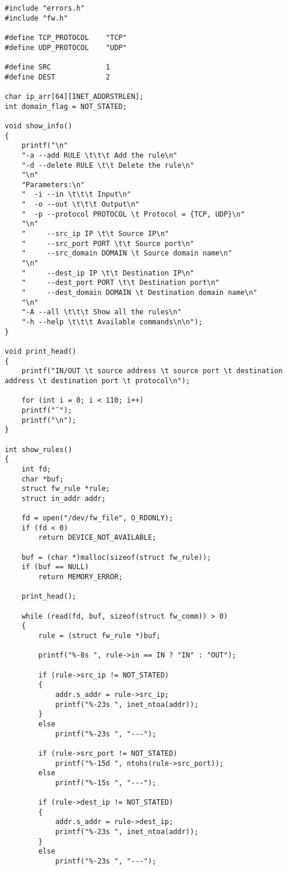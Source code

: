 \begin{lstlisting}[caption = {fw.c}]
#include "errors.h"
#include "fw.h"

#define TCP_PROTOCOL    "TCP"
#define UDP_PROTOCOL    "UDP"

#define SRC             1
#define DEST            2

char ip_arr[64][INET_ADDRSTRLEN];
int domain_flag = NOT_STATED;

void show_info()
{
	printf("\n"
	"-a --add RULE \t\t\t Add the rule\n"
	"-d --delete RULE \t\t Delete the rule\n"
	"\n"
	"Parameters:\n"
	"  -i --in \t\t\t Input\n"
	"  -o --out \t\t\t Output\n"
	"  -p --protocol PROTOCOL \t Protocol = {TCP, UDP}\n"
	"\n"
	"     --src_ip IP \t\t Source IP\n"
	"     --src_port PORT \t\t Source port\n"
	"     --src_domain DOMAIN \t Source domain name\n"
	"\n"
	"     --dest_ip IP \t\t Destination IP\n"
	"     --dest_port PORT \t\t Destination port\n"
	"     --dest_domain DOMAIN \t Destination domain name\n"
	"\n"
	"-A --all \t\t\t Show all the rules\n"
	"-h --help \t\t\t Available commands\n\n");
}

void print_head()
{
	printf("IN/OUT \t source address \t source port \t destination address \t destination port \t protocol\n");
	
	for (int i = 0; i < 110; i++)
	printf("¯");
	printf("\n");
}

int show_rules()
{
	int fd;
	char *buf;
	struct fw_rule *rule;
	struct in_addr addr;
	
	fd = open("/dev/fw_file", O_RDONLY);
	if (fd < 0)
		return DEVICE_NOT_AVAILABLE;
	
	buf = (char *)malloc(sizeof(struct fw_rule));
	if (buf == NULL)
		return MEMORY_ERROR;
	
	print_head();
	
	while (read(fd, buf, sizeof(struct fw_comm)) > 0) 
	{
		rule = (struct fw_rule *)buf;
		
		printf("%-8s ", rule->in == IN ? "IN" : "OUT");
		
		if (rule->src_ip != NOT_STATED)
		{
			addr.s_addr = rule->src_ip;
			printf("%-23s ", inet_ntoa(addr));
		}
		else
			printf("%-23s ", "---");
		
		if (rule->src_port != NOT_STATED)
			printf("%-15d ", ntohs(rule->src_port));
		else
			printf("%-15s ", "---");
		
		if (rule->dest_ip != NOT_STATED)
		{
			addr.s_addr = rule->dest_ip;
			printf("%-23s ", inet_ntoa(addr));
		}
		else
			printf("%-23s ", "---");
		

\end{lstlisting}
